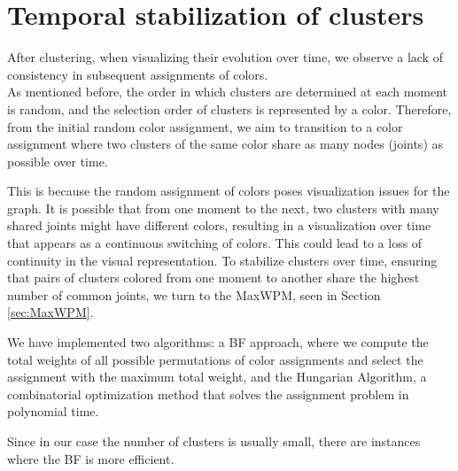 \chapter{Temporal stabilization of clusters}

After clustering, when visualizing their evolution over time, we observe a lack of consistency in subsequent assignments of colors. \\
As mentioned before, the order in which clusters are determined at each moment is random, and the selection order of clusters is represented by a color.
Therefore, from the initial random color assignment, we aim to transition to a color assignment where two clusters of the same color share as many nodes (joints) as possible over time.

This is because the random assignment of colors poses visualization issues for the graph.
It is possible that from one moment to the next, two clusters with many shared joints might have different colors, resulting in a visualization over time that appears as a continuous switching of colors. This could lead to a loss of continuity in the visual representation.
To stabilize clusters over time, ensuring that pairs of clusters colored from one moment to another share the highest number of common joints, we turn to the MaxWPM, seen in Section \ref{sec:MaxWPM}.

We have implemented two algorithms: a BF approach, where we compute the total weights of all possible permutations of color assignments and select the assignment with the maximum total weight, and the Hungarian Algorithm, a combinatorial optimization method that solves the assignment problem in polynomial time.

Since in our case the number of clusters is usually small, there are instances where the BF is more efficient.

